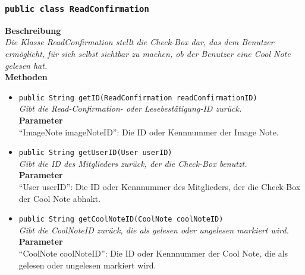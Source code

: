 \subsubsection{\texttt{public class ReadConfirmation}}

	\textbf{Beschreibung} \\
	\textit{Die Klasse ReadConfirmation stellt die Check-Box dar, das dem Benutzer ermöglicht, für sich selbst sichtbar zu machen, ob der Benutzer eine Cool Note gelesen hat.} \\
	
	\textbf{Methoden}
	\begin{itemize}
		\item\texttt{{public String getID(ReadConfirmation readConfirmationID)}}\\
		\textit{Gibt die Read-Confirmation- oder Lesebestätigung-ID zurück.}\\
		\textbf{Parameter}\\
		“ImageNote imageNoteID”: Die ID oder Kennnummer der Image Note.\\
		
		\item\texttt{{public String getUserID(User userID)}}\\
		\textit{Gibt die ID des Mitglieders zurück, der die Check-Box benutzt.}\\
		\textbf{Parameter}\\
		“User userID”: Die ID oder Kennnummer des Mitglieders, der die Check-Box der Cool Note abhakt.\\
		
		\item\texttt{{public String getCoolNoteID(CoolNote coolNoteID)}}\\
		\textit{Gibt die CoolNoteID zurück, die als gelesen oder ungelesen markiert wird.}\\
		\textbf{Parameter}\\
		“CoolNote coolNoteID”: Die ID oder Kennnummer der Cool Note, die als gelesen oder ungelesen markiert wird.\\
	\end{itemize}
